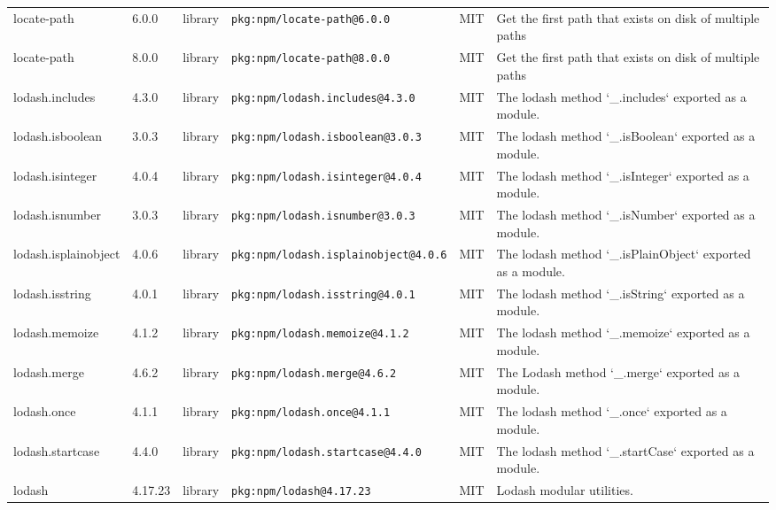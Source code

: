 \documentclass[11pt,a4paper]{article}
\begin{document}
\begin{longtable}{|p{4cm}|p{2cm}|p{1.6cm}|p{5cm}|p{1.5cm}|p{3.5cm}|}
\raggedright locate-path & 6.0.0 & library & \small\texttt{pkg:npm/locate-path@6.0.0} & MIT & \small Get the first path that exists on disk of multiple paths \\
\raggedright locate-path & 8.0.0 & library & \small\texttt{pkg:npm/locate-path@8.0.0} & MIT & \small Get the first path that exists on disk of multiple paths \\
\raggedright lodash.includes & 4.3.0 & library & \small\texttt{pkg:npm/lodash.includes@4.3.0} & MIT & \small The lodash method `\_.includes` exported as a module. \\
\raggedright lodash.isboolean & 3.0.3 & library & \small\texttt{pkg:npm/lodash.isboolean@3.0.3} & MIT & \small The lodash method `\_.isBoolean` exported as a module. \\
\raggedright lodash.isinteger & 4.0.4 & library & \small\texttt{pkg:npm/lodash.isinteger@4.0.4} & MIT & \small The lodash method `\_.isInteger` exported as a module. \\
\raggedright lodash.isnumber & 3.0.3 & library & \small\texttt{pkg:npm/lodash.isnumber@3.0.3} & MIT & \small The lodash method `\_.isNumber` exported as a module. \\
\raggedright lodash.isplainobject & 4.0.6 & library & \small\texttt{pkg:npm/lodash.isplainobject@4.0.6} & MIT & \small The lodash method `\_.isPlainObject` exported as a module. \\
\raggedright lodash.isstring & 4.0.1 & library & \small\texttt{pkg:npm/lodash.isstring@4.0.1} & MIT & \small The lodash method `\_.isString` exported as a module. \\
\raggedright lodash.memoize & 4.1.2 & library & \small\texttt{pkg:npm/lodash.memoize@4.1.2} & MIT & \small The lodash method `\_.memoize` exported as a module. \\
\raggedright lodash.merge & 4.6.2 & library & \small\texttt{pkg:npm/lodash.merge@4.6.2} & MIT & \small The Lodash method `\_.merge` exported as a module. \\
\raggedright lodash.once & 4.1.1 & library & \small\texttt{pkg:npm/lodash.once@4.1.1} & MIT & \small The lodash method `\_.once` exported as a module. \\
\raggedright lodash.startcase & 4.4.0 & library & \small\texttt{pkg:npm/lodash.startcase@4.4.0} & MIT & \small The lodash method `\_.startCase` exported as a module. \\
\raggedright lodash & 4.17.23 & library & \small\texttt{pkg:npm/lodash@4.17.23} & MIT & \small Lodash modular utilities. \\

\end{longtable}
\end{document}
